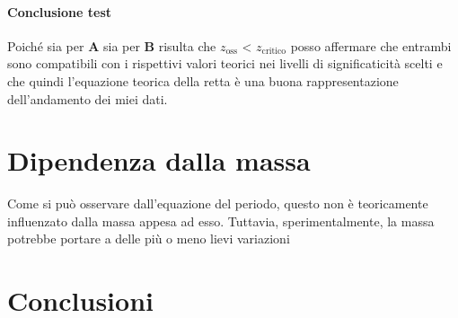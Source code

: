 \documentclass{article}
\begin{document}
\paragraph{Conclusione test} Poiché sia per $\mathbf{A}$ sia per $\mathbf{B}$ risulta che $z_{\text{oss}}$ < $z_{\text{critico}}$ posso affermare che entrambi sono compatibili con i rispettivi valori teorici nei livelli di significaticità scelti e che quindi l'equazione teorica della retta è una buona rappresentazione dell'andamento dei miei dati.




\newpage
\section{Dipendenza dalla massa}
Come si può osservare dall'equazione del periodo, questo non è teoricamente influenzato dalla massa appesa ad esso. Tuttavia, sperimentalmente, la massa potrebbe portare a delle più o meno lievi variazioni








\newpage
\section{Conclusioni}
\end{document}
